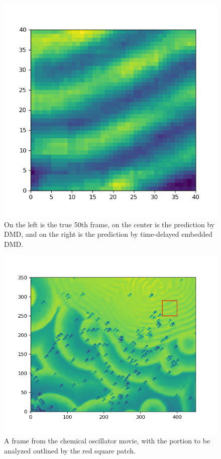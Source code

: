 \documentclass[letterpaper, 10 pt, conference]{ieeeconf}  %
\begin{document}
\begin{figure}[!t]
\endminipage\hfill
{}%
  \includegraphics[width=\linewidth]{images/movie_time_delayed_dmd.png}
\endminipage
\caption{On the left is the true 50th frame, on the center is the prediction by DMD, and on the right is the prediction by time-delayed embedded DMD.}
\label{fig:movie_pred}
\end{figure}

\begin{figure}[htb] 
\centering
\includegraphics[width=0.97\columnwidth]{images/movie_window.png}
\caption{A frame from the chemical oscillator movie, with the portion to be analyzed outlined by the red square patch.}
\label{fig:movie_window}
\end{figure}
\end{document}
